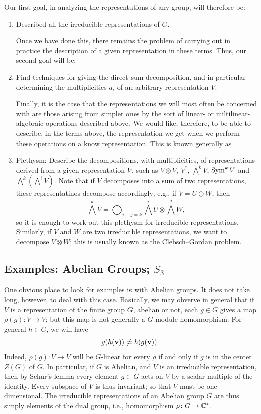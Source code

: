 Our first goal, in analyzing the representations of any group, will
therefore be:
\begin{enumerate}[label=(\alph*)]
\item Described all the irreducible representations of $G$.

  Once we have done this, there remains the problem of carrying out in
  practice the description of a given representation in these terms. Thus,
  our second goal will be:
\item Find techniques for giving the direct sum decomposition, and in
  particular determining the multiplicities $a_i$ of an arbitrary
  representation $V$.

  Finally, it is the case that the representations we will most often be
  concerned with are those arising from simpler ones by the sort of linear-
  or miltilinear-algebraic operations described above. We would like,
  therefore, to be able to describe, in the terms above, the representation
  we get when we perform these operations on a know representation. This is
  known generally as
\item Plethysm: Describe the decompositions, with multiplicities, of
  representations derived from a given representation $V$, such as
  $V\otimes V$, $V^*$, $\bigwedge^k V$, $\operatorname{Sym}^k V$ and
  $\bigwedge^k(\bigwedge^\ell V)$. Note that if $V$ decomposes into a sum
  of two representations, these representatinos decompose accordingly;
  e.g., if $V=U\oplus W$, then
  \[
    \bigwedge^k V=\bigoplus_{i+j=k}\bigwedge^i U\otimes\bigwedge^j W,
  \]
  so it is enough to work out this plethysm for irreducible
  representations. Similarly, if $V$ and $W$ are two irreducible
  representations, we want to decompose $V\otimes W$; this is usually known
  as the Clebsch--Gordan problem.
\end{enumerate}
\subsection{Examples: Abelian Groups; $S_3$}
One obvious place to look for examples is with Abelian groups. It does not
take long, however, to deal with this case. Basically, we may obverve in
general that if $V$ is a representation of the finite group $G$, abelian or
not, each $g\in G$ gives a map $\rho(g)\colon V\to V$; but this map is not
generally a $G$-module homomorphism: For general $h\in G$, we will have
\[
g(h(\mathbf{v}))\neq h(g(\mathbf{v})).
\]
Indeed, $\rho(g)\colon V\to V$ will be $G$-linear for every $\rho$ if and
only if $g$ is in the center $Z(G)$ of $G$. In particular, if $G$ is
Abelian, and $V$ is an irreducible representation, then by Schur's lemma
every element $g\in G$ acts on $V$ by a scalar multiple of the
identity. Every subspace of $V$ is thus invariant; so that $V$ must be one
dimensional. The irreducible representations of an Abelian group $G$ are
thus simply elements of the dual group, i.e., homomorphism $\rho\colon
G\to\mathbb{C}^*$.

